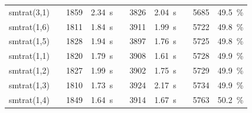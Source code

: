 \begin{table}[]
\begin{tabularx}{\textwidth}{lXrrXrrXrr}
    	\rowcolor{blue!20}
    	smtrat(3,1)
    	&& 1859 & 2.34~s
    	&& 3826 & 2.04~s
    	&& 5685 & 49.5~\%
    	\\
    	\rowcolor{green!20}
    	smtrat(1,6)
    	&& 1811 & 1.84~s
    	&& 3911 & 1.99~s
    	&& 5722 & 49.8~\%
    	\\
    	\rowcolor{green!20}
    	smtrat(1,5)
    	&& 1828 & 1.94~s
    	&& 3897 & 1.76~s
    	&& 5725 & 49.8~\%
    	\\
    	\rowcolor{green!20}
    	smtrat(1,1)
    	&& 1820 & 1.79~s
    	&& 3908 & 1.61~s
    	&& 5728 & 49.9~\%
    	\\
     	\rowcolor{green!20}
    	smtrat(1,2)
    	&& 1827 & 1.99~s
    	&& 3902 & 1.75~s
    	&& 5729 & 49.9~\%
    	\\
    	\rowcolor{green!20}
    	smtrat(1,3)
    	&& 1810 & 1.73~s
    	&& 3924 & 2.17~s
    	&& 5734 & 49.9~\%
    	\\
     	\rowcolor{green!20}
    	smtrat(1,4)
    	&& 1849 & 1.64~s
    	&& 3914 & 1.67~s
    	&& 5763 & 50.2~\%
    	\\
    	\bottomrule
    \end{tabularx}
\end{table}


